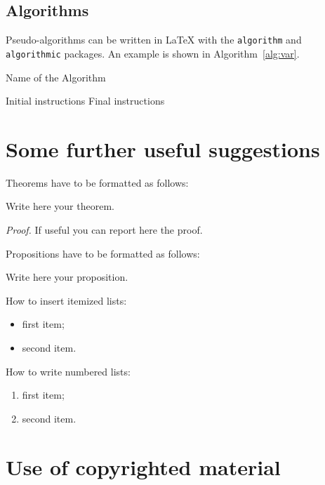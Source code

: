 \documentclass[11pt,a4paper]{article}
\begin{document}
\subsection{Algorithms}
\label{subsec:algorithms}

Pseudo-algorithms can be written in \LaTeX{} with the \texttt{algorithm} and \texttt{algorithmic} packages.
An example is shown in Algorithm~\ref{alg:var}.
\begin{algorithm}[H]
\label{alg:example}
\caption{Name of the Algorithm}
\label{alg:var}
\label{protocol1}
\begin{algorithmic}[1]
\STATE Initial instructions
\ENDIF
\ENDFOR
{}
\ENDWHILE
\STATE Final instructions
\end{algorithmic}
\end{algorithm}

\section{Some further useful suggestions}

Theorems have to be formatted as follows:
\begin{theorem}
\label{a_theorem}
Write here your theorem.
\end{theorem}
\textit{Proof.} If useful you can report here the proof.
\vspace{0.3cm} %

Propositions have to be formatted as follows:
\begin{proposition}
Write here your proposition.
\end{proposition}
\vspace{0.3cm} %

How to insert itemized lists:
\begin{itemize}
\item first item;
\item second item.
\end{itemize}
How to write numbered lists:
\begin{enumerate}
\item first item;
\item second item.
\end{enumerate}

\section{Use of copyrighted material}
\end{document}
